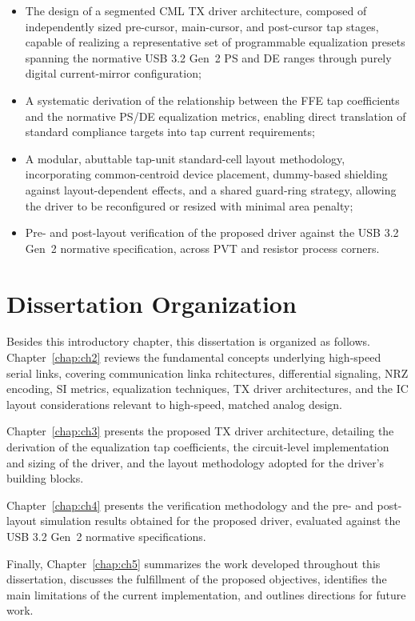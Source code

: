 \begin{itemize}
    \item The design of a segmented \ac{CML} \ac{TX} driver architecture, composed of independently sized pre-cursor, main-cursor, and post-cursor tap stages, capable of realizing a representative set of programmable equalization presets spanning the normative \ac{USB} 3.2 Gen~2 \ac{PS} and \ac{DE} ranges through purely digital current-mirror configuration;
    \item A systematic derivation of the relationship between the \ac{FFE} tap coefficients and the normative \ac{PS}/\ac{DE} equalization metrics, enabling direct translation of standard compliance targets into tap current requirements;
    \item A modular, abuttable tap-unit standard-cell layout methodology, incorporating common-centroid device placement, dummy-based shielding against layout-dependent effects, and a shared guard-ring strategy, allowing the driver to be reconfigured or resized with minimal area penalty;
    \item Pre- and post-layout verification of the proposed driver against the \ac{USB} 3.2 Gen~2 normative specification, across \ac{PVT} and resistor process corners.
\end{itemize}

\section{Dissertation Organization}

Besides this introductory chapter, this dissertation is organized as follows. Chapter~\ref{chap:ch2} reviews the fundamental concepts underlying high-speed serial links, covering communication linka rchitectures, differential signaling, \ac{NRZ} encoding, \ac{SI} metrics, equalization techniques, \ac{TX} driver architectures, and the \ac{IC} layout considerations relevant to high-speed, matched analog design. 

Chapter~\ref{chap:ch3} presents the proposed \ac{TX} driver architecture, detailing the derivation of the equalization tap coefficients, the circuit-level implementation and sizing of the driver, and the layout methodology adopted for the driver's building blocks. 

Chapter~\ref{chap:ch4} presents the verification methodology and the pre- and post-layout simulation results obtained for the proposed driver, evaluated against the \ac{USB} 3.2 Gen~2 normative specifications. 

Finally, Chapter~\ref{chap:ch5} summarizes the work developed throughout this dissertation, discusses the fulfillment of the proposed objectives, identifies the main limitations of the current implementation, and outlines directions for future work.